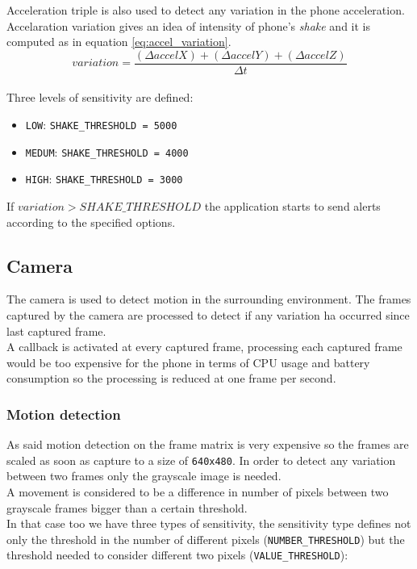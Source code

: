 \documentclass[conference]{IEEEtran}
\begin{document}
Acceleration triple is also used to detect any variation in the phone acceleration. Accelaration variation gives an idea of intensity of phone's \textit{shake} and it is computed as in equation \ref{eq:accel_variation}.\\

\begin{equation}
variation = \frac{(\Delta accelX)+(\Delta accelY)+(\Delta accelZ)}{\Delta t}
\label{eq:accel_variation}
\end{equation}
\vspace{.5cm}\\
Three levels of sensitivity are defined:
\begin{itemize}
	\item \texttt{LOW}: \texttt{SHAKE\_THRESHOLD = 5000}
	\item \texttt{MEDUM}:  \texttt{SHAKE\_THRESHOLD = 4000}
	\item \texttt{HIGH}:  \texttt{SHAKE\_THRESHOLD = 3000}
\end{itemize}

If $variation>SHAKE\_THRESHOLD$ the application starts to send alerts according to the specified options.

\subsection{\textbf{Camera}}
The camera is used to detect motion in the surrounding environment. The frames captured by the camera are processed to detect if any variation ha occurred since last captured frame.\\
A callback is activated at every captured frame, processing each captured frame would be too expensive for the phone in terms of CPU usage and battery consumption so the processing is reduced at one frame per second.\\
\subsubsection{\textbf{Motion detection}}
As said motion detection on the frame matrix is very expensive so the frames are scaled as soon as capture to a size of \texttt{640x480}. In order to detect any variation between two frames only the grayscale image is needed.\\
A movement is considered to be a difference in number of pixels between two grayscale frames bigger than a certain threshold.\\
In that case too we have three types of sensitivity, the sensitivity type defines not only the threshold in the number of different pixels (\texttt{NUMBER\_THRESHOLD}) but the threshold needed to consider different two pixels (\texttt{VALUE_THRESHOLD}):
\end{document}
